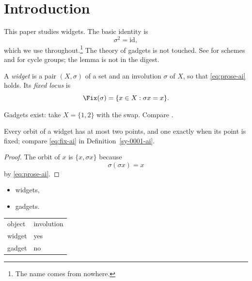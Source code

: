 \section{Introduction}\label{sy-0100-ai}

This paper studies widgets. The basic identity is
\begin{equation}\label{eq:prose-ai}
\sigma^2 = \mathrm{id},
\end{equation}
which we use throughout.\footnote{The name comes from nowhere.} The \GW{} theory of gadgets is not touched. See \cite[Chapter II]{Har77} for schemes and \cite[Theorem 2.1]{Kre99} for cycle groups; the lemma \cite[Lemma 9]{Kre99} is not in the digest.

\begin{definition}[Widget]\label{sy-0001-ai}
A \emph{widget} is a pair $(X,\sigma)$ of a set and an involution $\sigma$ of $X$, so that \eqref{eq:prose-ai} holds. Its \emph{fixed locus} is
\begin{equation}\label{eq:fix-ai}
\Fix(\sigma) = \{x \in X : \sigma x = x\}.
\end{equation}
\end{definition}


\begin{remark}\label{sy-000A-ai}
Gadgets exist: take $X = \{1,2\}$ with the swap. Compare \cite[Theorem 2.1]{Kre99}.
\end{remark}

\begin{lemma}[Orbits]\label{sy-0002-ai}
Every orbit of a widget has at most two points, and one exactly when its point is fixed; compare \eqref{eq:fix-ai} in Definition~\ref{sy-0001-ai}.
\end{lemma}
\begin{proof}
The orbit of $x$ is $\{x, \sigma x\}$ because
\begin{equation}\label{eq:step-ai}
\sigma(\sigma x) = x
\end{equation}
by \eqref{eq:prose-ai}.
\end{proof}


\begin{itemize}
\item widgets,
\item gadgets.
\end{itemize}

\begin{tabular}{ll}
object & involution \\
widget & yes \\
gadget & no
\end{tabular}

